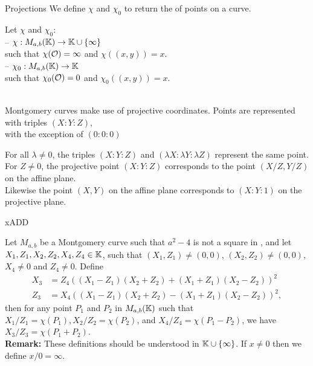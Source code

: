 \documentclass[8pt,aspectratio=169]{beamer}
\begin{document}
%
%
\begin{frame}[fragile]{Projections}
	We define $\chi$ and $\chi_0$ to return the \xcoord of points on a curve.
	\begin{dfn}Let $\chi$ and $\chi_0$:\\
		-- $\chi : M_{a,b}(\mathbb{K}) \to \mathbb{K} \cup \{\infty\}$\\
		such that $\chi(\mathcal{O}) = \infty$ and $\chi((x,y)) = x$.\\
		-- $\chi_0 : M_{a,b}(\mathbb{K}) \to \mathbb{K}$\\
		such that $\chi_0(\mathcal{O}) = 0$ and $\chi_0((x,y)) = x$.
	\end{dfn}

	~\\

	Montgomery curves make use of projective coordinates. Points are represented with triples $(X:Y:Z)$,\\
	with the exception of $(0:0:0)$

	For all $\lambda \neq 0$, the triples $(X:Y:Z)$ and $(\lambda X:\lambda Y:\lambda Z)$ represent the same point.\\
	For $Z\neq 0$, the projective point $(X:Y:Z)$ corresponds to the point $(X/Z,Y/Z)$ on the affine plane.\\
	Likewise the point $(X,Y)$ on the affine plane corresponds to $(X:Y:1)$ on the projective plane.

\end{frame}


%
%
\begin{frame}{xADD}
	\begin{lemma}
		Let $M_{a,b}$ be a Montgomery curve such that $a^2-4$ is not a square in \K, and
		let $X_1, Z_1, X_2, Z_2, X_4, Z_4 \in \mathbb{K}$, such that $(X_1,Z_1) \neq (0,0)$,
		$(X_2,Z_2) \neq (0,0)$, $X_4 \neq 0$ and $Z_4 \neq 0$.
		Define
		\begin{align*}
			X_3 & = Z_4((X_1 - Z_1)(X_2+Z_2) + (X_1+Z_1)(X_2-Z_2))^2  \\
			Z_3 & = X_4((X_1 - Z_1)(X_2+Z_2) - (X_1+Z_1)(X_2-Z_2))^2,
		\end{align*}
		then for any point $P_1$ and $P_2$ in $M_{a,b}(\mathbb{K})$ such that
		$X_1/Z_1 = \chi(P_1), X_2/Z_2 = \chi(P_2)$, and $X_4/Z_4 = \chi(P_1 - P_2)$,
		we have $X_3/Z_3 = \chi(P_1+P_2)$.\\
		\textbf{Remark:}
		These definitions should be understood in $\mathbb{K} \cup \{\infty\}$.
		If $x\ne 0$ then we define $x/0 = \infty$.
	\end{lemma}
\end{frame}
\end{document}
